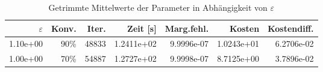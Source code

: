 \begin{table}[htbp]
\caption{Getrimmte Mittelwerte der Parameter in Abhängigkeit von $\varepsilon$}
\label{tab:Parametertest2048_1}
\small
\centering
{}
\begin{tabular}{rrrrrrr}
\toprule
$\varepsilon$ & Konv. & Iter. & Zeit [s] & Marg.fehl. & Kosten & Kostendiff. \\
\midrule
1.10e+00 & 90\% & 48833 & 1.2411e+02 & 9.9996e-07 & 1.0243e+01 & 6.2706e-02 \\
1.00e+00 & 70\% & 54887 & 1.2727e+02 & 9.9998e-07 & 8.7125e+00 & 3.7896e-02 \\
\bottomrule
\end{tabular}
\end{table}
